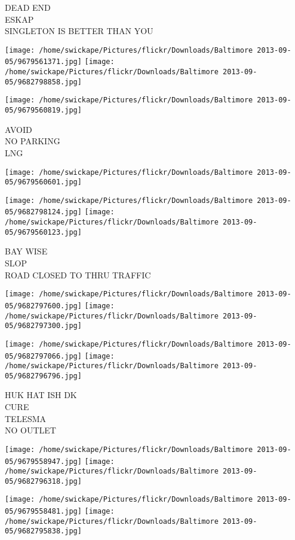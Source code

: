 \documentclass[10pt,letterpaper]{article}
\begin{document}
DEAD END\\
ESKAP\\
SINGLETON IS BETTER THAN YOU
\pagebreak

\texttt{[image: /home/swickape/Pictures/flickr/Downloads/Baltimore 2013-09-05/9679561371.jpg]}
\texttt{[image: /home/swickape/Pictures/flickr/Downloads/Baltimore 2013-09-05/9682798858.jpg]}

\texttt{[image: /home/swickape/Pictures/flickr/Downloads/Baltimore 2013-09-05/9679560819.jpg]}

AVOID\\
NO PARKING\\
LNG
\pagebreak

\texttt{[image: /home/swickape/Pictures/flickr/Downloads/Baltimore 2013-09-05/9679560601.jpg]}

\vspace{0.25in}
\texttt{[image: /home/swickape/Pictures/flickr/Downloads/Baltimore 2013-09-05/9682798124.jpg]}
\texttt{[image: /home/swickape/Pictures/flickr/Downloads/Baltimore 2013-09-05/9679560123.jpg]}

BAY WISE\\
SLOP\\
ROAD CLOSED TO THRU TRAFFIC
\pagebreak

\texttt{[image: /home/swickape/Pictures/flickr/Downloads/Baltimore 2013-09-05/9682797600.jpg]}
\texttt{[image: /home/swickape/Pictures/flickr/Downloads/Baltimore 2013-09-05/9682797300.jpg]}

\texttt{[image: /home/swickape/Pictures/flickr/Downloads/Baltimore 2013-09-05/9682797066.jpg]}
\texttt{[image: /home/swickape/Pictures/flickr/Downloads/Baltimore 2013-09-05/9682796796.jpg]}

HUK HAT ISH DK\\
CURE\\
TELESMA\\
NO OUTLET
\pagebreak

\texttt{[image: /home/swickape/Pictures/flickr/Downloads/Baltimore 2013-09-05/9679558947.jpg]}
\texttt{[image: /home/swickape/Pictures/flickr/Downloads/Baltimore 2013-09-05/9682796318.jpg]}

\texttt{[image: /home/swickape/Pictures/flickr/Downloads/Baltimore 2013-09-05/9679558481.jpg]}
\texttt{[image: /home/swickape/Pictures/flickr/Downloads/Baltimore 2013-09-05/9682795838.jpg]}
\end{document}
